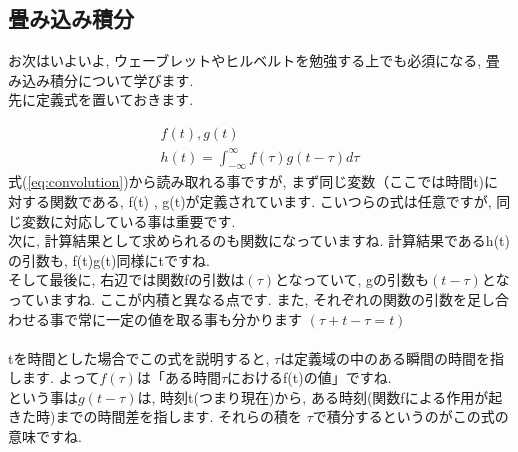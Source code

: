 \documentclass[11pt,a4paper]{jreport}
\begin{document}
\subsection{畳み込み積分 \label{convolution}}
お次はいよいよ, ウェーブレットやヒルベルトを勉強する上でも必須になる, 畳み込み積分について学びます.\\
先に定義式を置いておきます.

\begin{eqnarray}
\label{eq:convolution}
f(t) , g(t)\\
h(t) = \int^{\infty}_{-\infty} f(\tau) g(t - \tau) d\tau
\end{eqnarray}
式(\ref{eq:convolution})から読み取れる事ですが, まず同じ変数（ここでは時間t)に対する関数である, f(t) , g(t)が定義されています. こいつらの式は任意ですが, 同じ変数に対応している事は重要です. \\
次に, 計算結果として求められるのも関数になっていますね. 計算結果であるh(t)の引数も, f(t)g(t)同様にtですね.\\
そして最後に, 右辺では関数fの引数は$(\tau)$となっていて, gの引数も$(t - \tau)$となっていますね. ここが内積と異なる点です. また, それぞれの関数の引数を足し合わせる事で常に一定の値を取る事も分かります $(\tau + t - \tau = t)$\\
\\
tを時間とした場合でこの式を説明すると, $\tau$は定義域の中のある瞬間の時間を指します. よって$f(\tau)$は「ある時間$\tau$におけるf(t)の値」ですね.\\
という事は$g(t-\tau)$は, 時刻t(つまり現在)から, ある時刻(関数fによる作用が起きた時)までの時間差を指します. それらの積を $\tau$で積分するというのがこの式の意味ですね.\\
\\
\\
\end{document}
